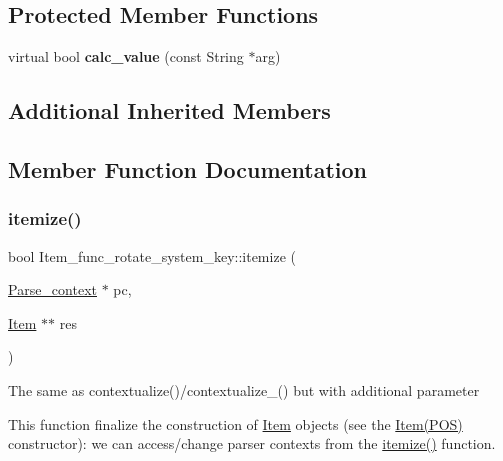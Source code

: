\subsection*{Protected Member Functions}
\begin{DoxyCompactItemize}
\item 
\mbox{\label{classItem__func__rotate__system__key_a2b976286f89aebd7e3856324ed9d981a}} 
virtual bool {\bfseries calc\+\_\+value} (const String $\ast$arg)
\end{DoxyCompactItemize}
\subsection*{Additional Inherited Members}


\subsection{Member Function Documentation}
\mbox{\label{classItem__func__rotate__system__key_a9fb9f671f7e7e6cc30d52cf84be06237}} 
\subsubsection{\texorpdfstring{itemize()}{itemize()}}
{\footnotesize\ttfamily bool Item\+\_\+func\+\_\+rotate\+\_\+system\+\_\+key\+::itemize (\begin{DoxyParamCaption}\item[{\mbox{\hyperlink{structParse__context}{Parse\+\_\+context}} $\ast$}]{pc,  }\item[{\mbox{\hyperlink{classItem}{Item}} $\ast$$\ast$}]{res }\end{DoxyParamCaption})\hspace{0.3cm}{\ttfamily [virtual]}}

The same as contextualize()/contextualize\+\_\+() but with additional parameter

This function finalize the construction of \mbox{\hyperlink{classItem}{Item}} objects (see the \mbox{\hyperlink{classItem}{Item(\+P\+O\+S)}} constructor)\+: we can access/change parser contexts from the \mbox{\hyperlink{classItem__func__rotate__system__key_a9fb9f671f7e7e6cc30d52cf84be06237}{itemize()}} function.


